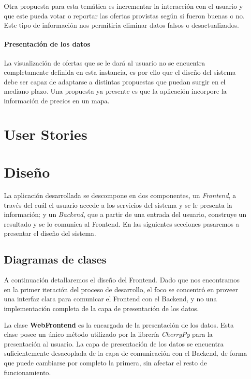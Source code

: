 \documentclass[10pt, a4paper]{article}
\begin{document}
Otra propuesta para esta temática es incrementar la interacción con el usuario y que este pueda votar o reportar las ofertas provistas según si fueron buenas o no. Este tipo de información nos permitiria eliminar datos falsos o desactualizados.

\paragraph{Presentación de los datos}
La visualización de ofertas que se le dará al usuario no se encuentra completamente definida en esta instancia, es por ello que el diseño del sistema debe ser capaz de adaptarse a distintas propuestas que puedan surgir en el mediano plazo. Una propuesta ya presente es que la aplicación incorpore la información de precios en un mapa.


\section{User Stories}



\section{Diseño}

La aplicación desarrollada se descompone en dos componentes, un \emph{Frontend}, a través del cuál el usuario accede a los servicios del sistema y se le presenta la información; y un \emph{Backend}, que a partir de una entrada del usuario, construye un resultado y se lo comunica al Frontend. En las siguientes secciones pasaremos a presentar el diseño del sistema.

\subsection{Diagramas de clases}
  
A continuación detallaremos el diseño del Frontend. Dado que nos encontramos en la primer iteración del proceso de desarrollo, el foco se concentró en proveer una interfaz clara para comunicar el Frontend con el Backend, y no una implementación completa de la capa de presentación de los datos.

La clase \textbf{WebFrontend} es la encargada de la presentación de los datos. Esta clase posee un único método utilizado por la librería \emph{CherryPy} para la presentación al usuario. La capa de presentación de los datos se encuentra suficientemente desacoplada de la capa de comunicación con el Backend, de forma que puede cambiarse por completo la primera, sin afectar el resto de funcionamiento.
\end{document}
